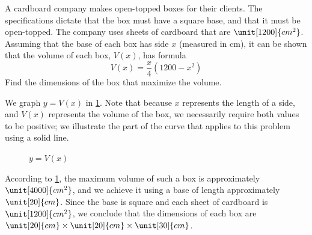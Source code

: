 	 \begin{pccexample}
		 A cardboard company makes open-topped boxes for their clients. The specifications
		 dictate that the box must have a square base, and that it must be open-topped.
		 The company uses sheets of cardboard that are $\unit[1200]{cm^2}$. Assuming that
		 the base of each box has side $x$ (measured in cm), it can be shown that the volume of each box, $V(x)$,
		 has formula
		 \[
			 V(x)=\frac{x}{4}(1200-x^2)
		 \]
		 Find the dimensions of the box that maximize the volume.
		 \begin{pccsolution}
			 We graph $y=V(x)$ in \cref{poly:fig:opentoppedbox}. Note that because
			 $x$ represents the length of a side, and $V(x)$ represents the volume
			 of the box, we necessarily require both values to be positive; we illustrate
			 the part of the curve that applies to this problem using a solid line.

			 \begin{figure}[!htb]
				 \centering
				 \caption{$y=V(x)$}
				 \label{poly:fig:opentoppedbox}
			 \end{figure}

			 According to \cref{poly:fig:opentoppedbox}, the maximum volume of such a box is
			 approximately $\unit[4000]{cm^2}$, and we achieve it using a base of length
			 approximately $\unit[20]{cm}$. Since the base is square and each sheet of cardboard
			 is $\unit[1200]{cm^2}$, we conclude that the dimensions of each box are $\unit[20]{cm}\times\unit[20]{cm}\times\unit[30]{cm}$.
		 \end{pccsolution}
	 \end{pccexample}

